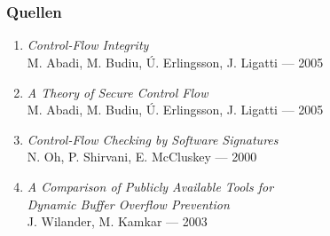 \documentclass[mathserif,slidestop,compress,red]{beamer}
\begin{document}
\section*{}

\begin{frame}
  \frametitle{Quellen}
  \begin{enumerate}
    \item \emph{Control-Flow Integrity} \\ M. Abadi, M. Budiu, Ú. Erlingsson, J. Ligatti — 2005
    \item \emph{A Theory of Secure Control Flow} \\ M. Abadi, M. Budiu, Ú. Erlingsson, J. Ligatti — 2005
    \item \emph{Control-Flow Checking by Software Signatures} \\ N. Oh, P. Shirvani, E. McCluskey — 2000
    \item \emph{A Comparison of Publicly Available Tools for \\ Dynamic Buffer Overflow Prevention} \\
        J. Wilander, M. Kamkar — 2003
  \end{enumerate}
\end{frame}

\end{document}

